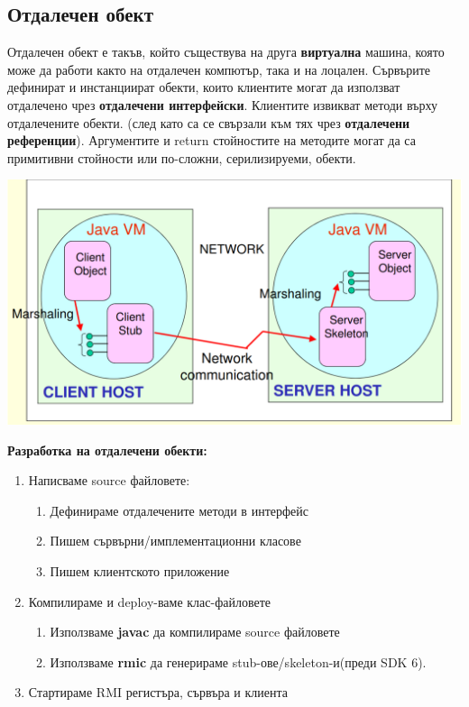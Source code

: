 \documentclass[11pt]{article} %
\begin{document}
\subsection{Отдалечен обект}
Отдалечен обект е такъв, който съществува на друга \textbf{виртуална} машина, която може да работи както на отдалечен компютър, така и на лоцален. Сървърите дефинират и инстанциират обекти, които клиентите могат да използват отдалечено чрез \textbf{отдалечени интерфейски}. Клиентите извикват методи върху отдалечените обекти. (след като са се свързали към тях чрез \textbf{отдалечени референции}). Аргументите и return стойностите на методите могат да са примитивни стойности или по-сложни, серилизируеми, обекти.
\begin{center}
	\includegraphics[scale=0.55]{RemoteObjects.png}
\end{center}

\textbf{Разработка на отдалечени обекти: }
\begin{enumerate}[noitemsep]
	\item Написваме source файловете:
	\begin{enumerate}[noitemsep]
		\item Дефинираме отдалечените методи в интерфейс
		\item Пишем сървърни/имплементационни класове
		\item Пишем клиентското приложение
	\end{enumerate}
	\item Компилираме и deploy-ваме клас-файловете
	\begin{enumerate}[noitemsep]
		\item Използваме \textbf{javac} да компилираме source файловете
		\item Използваме \textbf{rmic} да генерираме stub-ове/skeleton-и(преди SDK 6).
	\end{enumerate}
	\item Стартираме RMI регистъра, сървъра и клиента
\end{enumerate}
\end{document}
